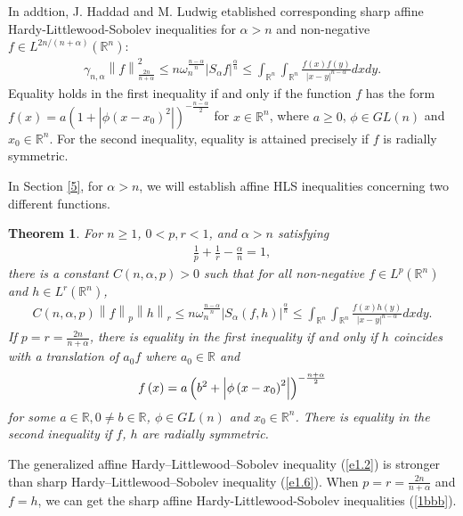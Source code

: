 \documentclass[preprint,12pt]{elsarticle}
\newtheorem{thm}{Theorem}
\begin{document}
	In addtion, J. Haddad and M. Ludwig \cite[Theorem 14]{JM22} etablished corresponding sharp affine Hardy-Littlewood-Sobolev inequalities for $\alpha > n$ and non-negative $f\in {L}^{2n/(n+\alpha)} (\mathbb{R}^n)$: \begin{eqnarray}\label{1bbb}
		\gamma _{n,\alpha }\left \| f \right \|_{\frac{2n}{n+  \alpha } }^{2}\le n\omega _{n}^{\frac{n-\alpha }{n} }\left | S_{\alpha  } f \right |^{\frac{\alpha }{n} }
		\le \int_{\mathbb{R}^n } \int_{\mathbb{R}^n }\frac{f\left ( x \right )f\left ( y \right )  }{\left | x-y \right |^{n-\alpha }  }dxdy. 
	\end{eqnarray}
     Equality holds in the first inequality if and only if the function $f$ has the form $f\left( x \right )=a\left ( 1+\left | \phi\left( x-x_{0} \right )^{2}  \right|\right )^{-\frac{n-\alpha }{2} }$ for $x\in \mathbb{R}^n$, where $a\ge0$, $\phi\in GL\left ( n \right )$ and $x_{0}\in \mathbb{R}^n$. For the second inequality, equality is attained precisely if $f$ is radially symmetric. 
	
	In Section \ref{5}, for $\alpha > n$,  we will establish affine HLS inequalities concerning two different functions.
	\begin{thm}\label{1.2}
		For $n\ge 1$, $0<p,r<1  $, and $\alpha >n$ satisfying
		\begin{eqnarray}
			\frac{1}{p}+\frac{1}{r}-\frac{\alpha }{n}=1,\nonumber   
		\end{eqnarray}
		there is a constant $C\left ( n,\alpha ,p \right )>0 $ such that for all non-negative $f\in L^{p}\left ( \mathbb{R}^n  \right ) $ and $h\in L^{r}\left ( \mathbb{R}^n  \right ) $,
		\begin{eqnarray}\label{e1.2}
			C\left ( n,\alpha ,p \right )\left \| f \right \|_{p}\left \| h \right \|_{r}\le n\omega^{\frac{n-\alpha }{n} }_{n}\left | S_{\alpha  }\left ( f,h \right )   \right |^{\frac{\alpha }{n} }\le\int_{\mathbb{R}^n}\int_{\mathbb{R}^n}\frac{f\left ( x \right )h\left ( y \right )  }{\left | x-y \right |^{n-\alpha }  }dxdy .
		\end{eqnarray}
		If $p=r=\frac{2n}{n+\alpha } $, there is equality in the first inequality if and only if  $h$ coincides with a translation of $a_{0} f$ where $a_{0}\in \mathbb{R}$ and
		\begin{eqnarray}
			f\left ( x \right )=a\left ( b ^{2}+\left | \phi \left ( x-x_{0} \right )^{2}    \right |   \right )^{-\frac{n+\alpha }{2} }\notag
		\end{eqnarray}
		for some $a\in \mathbb{R}, 0\ne b \in \mathbb{R}$,  $\phi \in GL\left ( n \right )$   and $x_{0}\in \mathbb{R }^{n}  $. There is equality in the second inequality if  $f$, $h$ are radially symmetric.
	\end{thm}
	The generalized affine Hardy–Littlewood–Sobolev inequality (\ref{e1.2}) is stronger than sharp  Hardy–Littlewood–Sobolev inequality (\ref{e1.6}). When $p=r=\frac{2n}{n+\alpha } $ and $f=h$, we can get the sharp affine Hardy-Littlewood-Sobolev inequalities (\ref{1bbb}). 
	
\end{document}
